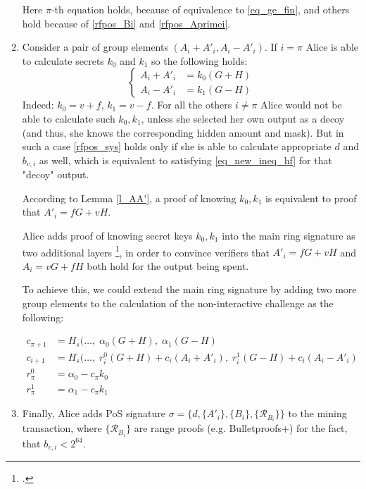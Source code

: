 \documentclass{article}
\numberwithin{figure}{section}
\begin{document}
\begin{enumerate}
    Here $\pi$-th equation holds, because of equivalence to \eqref{eq_ge_fin}, and others hold because of \eqref{rfpos_Bi} and \eqref{rfpos_Aprimei}.
    
    \item Consider a pair of group elements $(A_i+A'_i, A_i-A'_i)$. If $i = \pi$ Alice is able to calculate secrets $k_0$ and $k_1$ so the following holds:
    \begin{equation*}
    \left\{ \begin{aligned} 
        A_i + A'_i &= k_0 (G + H) \\
        A_i - A'_i &= k_1 (G - H)
    \end{aligned} \right.
    \end{equation*}
    Indeed: $k_0 = v + f$, $k_1 = v - f$. For all the others $i \neq \pi$ Alice would not be able to calculate such $k_0, k_1$, unless she selected her own output as a decoy (and thus, she knows the corresponding hidden amount and mask). But in such a case \eqref{rfpos_sys} holds only if she is able to calculate appropriate $d$ and $b_{v,i}$ as well, which is equivalent to satisfying \eqref{eq_new_ineq_hf} for that "decoy" output.
    
    According to Lemma \ref{l_AA'}, a proof of knowing $k_0, k_1$ is equivalent to proof that $A'_i = fG + vH$.
    
    Alice adds proof of knowing secret keys $k_0, k_1$ into the main ring signature as two additional layers \footcite[Here we're using terminology and ideas from Multi-layered Linkable Spontaneous Anonymous Group signature proposed in][]{MRL0005}, in order to convince verifiers that $A'_i = fG + vH$ and $A_i = vG + fH$ both hold for the output being spent.
    
    To achieve this, we could extend the main ring signature by adding two more group elements to the calculation of the non-interactive challenge as the following:
    
    \begin{equation*} \begin{aligned}
        c_{\pi+1} &= H_s(\dots, \; \alpha_0 (G + H), \; \alpha_1 (G - H) \\
        c_{i+1} &= H_s(\dots, \; r^0_i (G + H) + c_i (A_i + A'_i), \; r^1_i (G - H) + c_i (A_i - A'_i) \\
        r^0_\pi &= \alpha_0 - c_\pi k_0 \\
        r^1_\pi &= \alpha_1 - c_\pi k_1
     \end{aligned} \end{equation*}
     
     \item Finally, Alice adds PoS signature $\sigma = \{ d, \{A'_i\}, \{B_i\}, \{\mathcal{R}_B_i\} \}$ to the mining transaction, where $\{\mathcal{R}_B_i\}$ are range proofs (e.g. Bulletproofs+) for the fact, that $b_{v,i} < 2^{64}$.
\end{enumerate}
\end{document}
